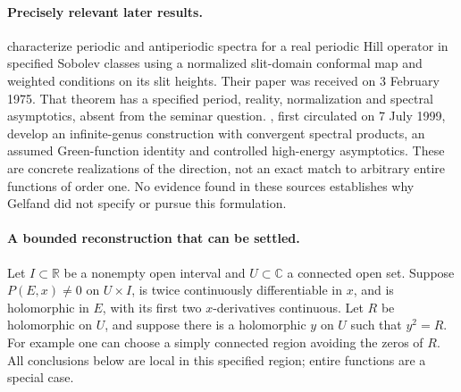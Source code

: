 \paragraph{Precisely relevant later results.}
\citet[Thm.~5.1, pp.~535--536]{marchenko1975characterization} characterize
periodic and antiperiodic spectra for a real periodic Hill operator in specified
Sobolev classes using a normalized slit-domain conformal map and weighted
conditions on its slit heights. Their paper was received on 3 February 1975.
That theorem has a specified period, reality, normalization and spectral
asymptotics, absent from the seminar question. \citet[Hypotheses~3.1--3.2,
Eq.~(3.14), Lemmas~3.3--3.5]{gesztesy1999infinite}, first circulated on
7 July 1999, develop an infinite-genus construction with convergent spectral
products, an assumed Green-function identity and controlled high-energy
asymptotics. These are concrete realizations of the direction, not an exact
match to arbitrary entire functions of order one. No evidence found in these
sources establishes why Gelfand did not specify or pursue this formulation.

\paragraph{A bounded reconstruction that can be settled.}
Let \(I\subset\mathbb R\) be a nonempty open interval and \(U\subset\mathbb C\)
a connected open set. Suppose \(P(E,x)\ne0\) on \(U\times I\), is twice
continuously differentiable in \(x\), and is holomorphic in \(E\), with its first
two \(x\)-derivatives continuous. Let \(R\) be holomorphic on \(U\), and suppose
there is a holomorphic \(y\) on \(U\) such that \(y^2=R\). For example one can
choose a simply connected region avoiding the zeros of \(R\). All conclusions
below are local in this specified region; entire functions are a special case.

